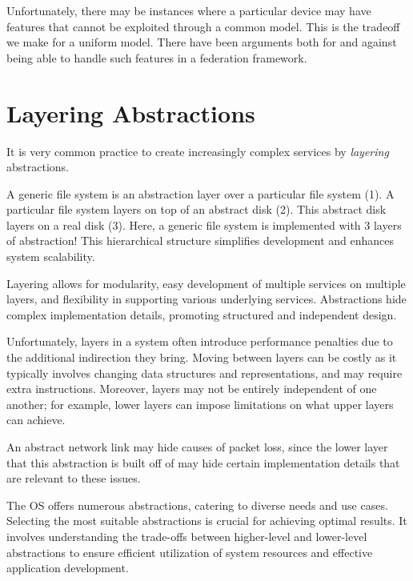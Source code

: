 \documentclass{report}
\begin{document}
Unfortunately, there may be instances where a particular device may have features that cannot be
exploited through a common model. This is the tradeoff we make for a uniform model. There have been
arguments both for and against being able to handle such features in a federation framework.


\section{Layering Abstractions}
It is very common practice to create increasingly complex services by \textit{layering}
abstractions.

\begin{tcolorbox}[colback=blue!5!white,colframe=black!75!blue,title=Example: Abstract Abstract Abstract!] 
  A generic file system is an abstraction layer over a particular file system (1). A particular file
  system layers on top of an abstract disk (2). This abstract disk layers on a real disk (3). Here,
  a generic file system is implemented with 3 layers of abstraction! This hierarchical structure
  simplifies development and enhances system scalability.
\end{tcolorbox}

Layering allows for modularity, easy development of multiple services on multiple layers, and
flexibility in supporting various underlying services. Abstractions hide complex implementation
details, promoting structured and independent design.

Unfortunately, layers in a system often introduce performance penalties due to the additional
indirection they bring. Moving between layers can be costly as it typically involves changing data
structures and representations, and may require extra instructions. Moreover, layers may not be
entirely independent of one another; for example, lower layers can impose limitations on what upper
layers can achieve.

\begin{tcolorbox}[colback=blue!5!white,colframe=black!75!blue,title=Example: Packages Play Hide n Seek] 
  An abstract network link may hide causes of packet loss, since the lower layer that this
  abstraction is built off of may hide certain implementation details that are relevant to these issues.
\end{tcolorbox}

The OS offers numerous abstractions, catering to diverse needs and use cases. Selecting
the most suitable abstractions is crucial for achieving optimal results. It involves
understanding the trade-offs between higher-level and lower-level abstractions to ensure efficient
utilization of system resources and effective application development.
\end{document}
